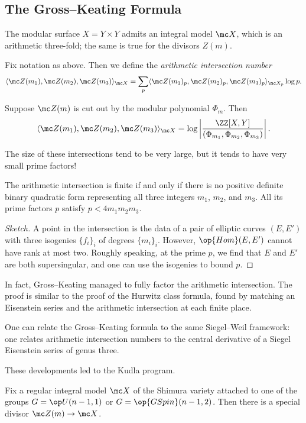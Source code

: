 \documentclass{article}
\begin{document}
\subsection{The Gross--Keating Formula}
The modular surface $X=Y\times Y$ admits an integral model $\mc X$, which is an arithmetic three-fold; the same is true for the divisors $Z(m)$.
\begin{definition}
	Fix notation as above. Then we define the \textit{arithmetic intersection number}
	\[\langle\mc Z(m_1),\mc Z(m_2),\mc Z(m_3)\rangle_{\mc X}=\sum_p\langle\mc Z(m_1)_p,\mc Z(m_2)_p,\mc Z(m_3)_p\rangle_{\mc X_p}\log p.\]
\end{definition}
\begin{remark}
	Suppose $\mc Z(m)$ is cut out by the modular polynomial $\Phi_m$. Then
	\[\langle\mc Z(m_1),\mc Z(m_2),\mc Z(m_3)\rangle_{\mc X}=\log\left|\frac{\ZZ[X,Y]}{(\Phi_{m_1},\Phi_{m_2},\Phi_{m_3})}\right|.\]
\end{remark}
The size of these intersections tend to be very large, but it tends to have very small prime factors!
\begin{theorem}
	The arithmetic intersection is finite if and only if there is no positive definite binary quadratic form representing all three integers $m_1$, $m_2$, and $m_3$. All its prime factors $p$ satisfy $p<4m_1m_2m_3$.
\end{theorem}
\begin{proof}[Sketch]
	A point in the intersection is the data of a pair of elliptic curves $(E,E')$ with three isogenies $\{f_i\}_i$ of degrees $\{m_i\}_i$. However, $\op{Hom}(E,E')$ cannot have rank at most two. Roughly speaking, at the prime $p$, we find that $E$ and $E'$ are both supersingular, and one can use the isogenies to bound $p$.
\end{proof}
\begin{remark}
	In fact, Gross--Keating managed to fully factor the arithmetic intersection. The proof is similar to the proof of the Hurwitz class formula, found by matching an Eisenstein series and the arithmetic intersection at each finite place.
\end{remark}
\begin{remark}
	One can relate the Gross--Keating formula to the same Siegel--Weil framework: one relates arithmetic intersection numbers to the central derivative of a Siegel Eisenstein series of genus three.
\end{remark}
These developments led to the Kudla program.
\begin{theorem}
	Fix a regular integral model $\mc X$ of the Shimura variety attached to one of the groups $G=\op U(n-1,1)$ or $G=\op{GSpin}(n-1,2)$. Then there is a special divisor $\mc Z(m)\to\mc X$.
\end{theorem}
\end{document}
